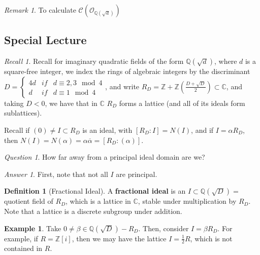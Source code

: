 \documentclass[12pt]{article}
\theoremstyle{definition}
\newtheorem{defn}[thm]{Definition}
\newtheorem{eg}[thm]{Example}
\theoremstyle{remark}
\newtheorem{rmk}[thm]{Remark}
\newtheorem*{qst}{Question}
\newtheorem*{ans}{Answer}
\newtheorem*{rec}{Recall}
\numberwithin{equation}{section}
\newcommand\C{\mathbb C}    %
\newcommand\Z{\mathbb Z}    %
\newcommand\Q{\mathbb Q}    %
\newcommand\B[1]{\textbf{ #1}}
\begin{document}
\vspace{15pt}

\begin{rmk}
        To calculate $\mathcal{C}(\mathcal{O}_{\Q(\sqrt{d})})$
\end{rmk}

\subsection{Special Lecture}

\begin{rec}
        Recall for imaginary quadratic fields of the form $\Q(\sqrt{d})$, where $d$ is a square-free integer, we index the rings of algebraic integers by the discriminant $D = \left\{\begin{array}{ccc} 4d & if & d\equiv 2,3\mod 4 \\ d & if & d \equiv 1 \mod 4 \end{array}\right.$, and write $R_D = \Z + \Z\left(\frac{D+\sqrt{D}}{2}\right) \subset \C$, and taking $D < 0$, we have that in $\C$ $R_D$ forms a lattice (and all of its ideals form sublattices).


        Recall if $(0) \neq I \subset R_D$ is an ideal, with $[R_D:I] = N(I)$, and if $I = \alpha R_D$, then $N(I) = N(\alpha) = \alpha\overline{\alpha} = [R_D:(\alpha)]$.
\end{rec}

\vspace{15pt}

\begin{qst}
        How far away from a principal ideal domain are we?
\end{qst}
\begin{ans}
        First, note that not all $I$ are principal. 
\end{ans}

\vspace{15pt}


\begin{defn}[Fractional Ideal]
        A \B{fractional ideal} is an $I\subset \Q(\sqrt{D})=$ quotient field of $R_D$, which is a lattice in $\C$, stable under multiplication by $R_D$. Note that a lattice is a discrete subgroup under addition.
\end{defn}


\vspace{15pt}

\begin{eg}
        Take $0\neq \beta \in \Q(\sqrt{D})-R_D$. Then, consider $I = \beta R_D$. For example, if $R = \Z[i]$, then we may have the lattice $I = \frac{1}{2}R$, which is not contained in $R$.
\end{eg}
\end{document}
